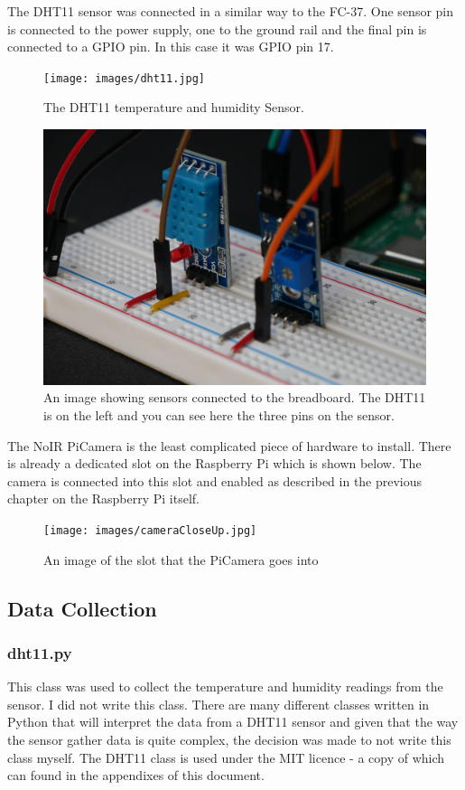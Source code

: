 \documentclass[10pt,a4paper]{article}
\begin{document}
The DHT11 sensor was connected in a similar way to the FC-37. One sensor pin is connected to the power supply, one to the ground rail and the final pin is connected to a GPIO pin. In this case it was GPIO pin 17. 

\begin{figure}[H]
  \centering
    \texttt{[image: images/dht11.jpg]}
    \caption{The DHT11 temperature and humidity Sensor.}
    \label{fig:dht11}
\end{figure}

\begin{figure}[H]
  \centering
    \includegraphics[width=\linewidth]{images/sensorCloseup.jpg}
    \caption{An image showing sensors connected to the breadboard. The DHT11 is on the left and you can see here the three pins on the sensor.}
    \label{fig:piCam}
\end{figure}

The NoIR PiCamera is the least complicated piece of hardware to install. There is already a dedicated slot on the Raspberry Pi which is shown below. The camera is connected into this slot and enabled as described in the previous chapter on the Raspberry Pi itself. 

\begin{figure}[H]
  \centering
    \texttt{[image: images/cameraCloseUp.jpg]}
    \caption{An image of the slot that the PiCamera goes into}
    \label{fig:piCamCloseUp}
\end{figure}

\subsection{Data Collection}
\subsubsection{dht11.py}
This class was used to collect the temperature and humidity readings from the sensor. I did not write this class. There are many different classes written in Python that will interpret the data from a DHT11 sensor and given that the way the sensor gather data is quite complex, the decision was made to not write this class myself. The DHT11 class is used under the MIT licence - a copy of which can found in the appendixes of this document. 
\end{document}
